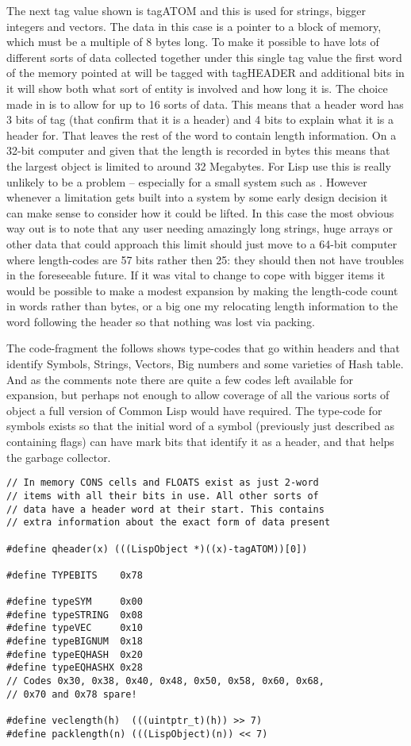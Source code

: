 The next tag value shown is {\tx tagATOM} and this is used for
strings, bigger integers and vectors. The data in this case is a
pointer to a block of memory, which must be a multiple of 8 bytes
long. To make it possible to have lots of different sorts of data
collected together under this single tag value the first word of
the memory pointed at will be tagged with {\tx tagHEADER} and additional
bits in it will show both what sort of entity is involved and how
long it is. The choice made in \vsl{} is to allow for up to 16 sorts of
data. This means that a header word has 3 bits of tag (that confirm
that it is a header) and 4 bits to explain what it is a header for. That
leaves the rest of the word to contain length information. On a 32-bit
computer and given that the length is recorded in bytes this means that
the largest object is limited to around 32 Megabytes. For Lisp
use this is really unlikely to be a problem -- especially for a small
system such as \vsl. However whenever a limitation gets built into
a system by some early design decision it can make sense to consider how it
could be lifted. In this case the most obvious way out is to note that
any user needing amazingly long strings, huge arrays or other data that
could approach this limit should just move to a 64-bit computer where
\vsl{} length-codes are 57 bits rather then 25: they should then not
have troubles in the foreseeable future. If it was vital to change
\vsl{} to cope with bigger items it would be possible to make a modest
expansion by making the length-code count in words rather than bytes, or
a big one my relocating length information to the word following the header
so that nothing was lost via packing.

The code-fragment the follows shows type-codes that go within headers
and that identify Symbols, Strings, Vectors, Big numbers and some varieties
of Hash table. And as the comments note there are quite a few codes left
available for expansion, but perhaps not enough to allow coverage of all
the various sorts of object a full version of Common Lisp would have
required. The type-code for symbols exists so that the initial word
of a symbol (previously just described as containing flags) can have mark
bits that identify it as a header, and that helps the garbage collector.
{\small\begin{verbatim}
// In memory CONS cells and FLOATS exist as just 2-word
// items with all their bits in use. All other sorts of
// data have a header word at their start. This contains
// extra information about the exact form of data present

#define qheader(x) (((LispObject *)((x)-tagATOM))[0])

#define TYPEBITS    0x78

#define typeSYM     0x00
#define typeSTRING  0x08
#define typeVEC     0x10
#define typeBIGNUM  0x18
#define typeEQHASH  0x20
#define typeEQHASHX 0x28
// Codes 0x30, 0x38, 0x40, 0x48, 0x50, 0x58, 0x60, 0x68,
// 0x70 and 0x78 spare!

#define veclength(h)  (((uintptr_t)(h)) >> 7)
#define packlength(n) (((LispObject)(n)) << 7)
\end{verbatim}}

